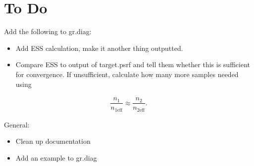 \documentclass[12pt]{article}
\theoremstyle{remark}
\begin{document}
\section{To Do} %

Add the following to gr.diag:
\begin{itemize}
 \renewcommand{\labelitemi}{$\square$}
\item Add ESS calculation, make it another thing outputted.
\item Compare ESS to output of target.psrf and tell them whether this is sufficient for convergence. If unsufficient, calculate how many more samples needed using
\end{itemize}

\begin{align*}
\dfrac{n_1}{n_{1 \text{eff}}} \approx \dfrac{n_2}{n_{2 \text{eff}}}.
\end{align*}

General:
\begin{itemize}
 \renewcommand{\labelitemi}{$\square$}
\item Clean up documentation
\item Add an example to gr.diag
\end{itemize}








\end{document}
